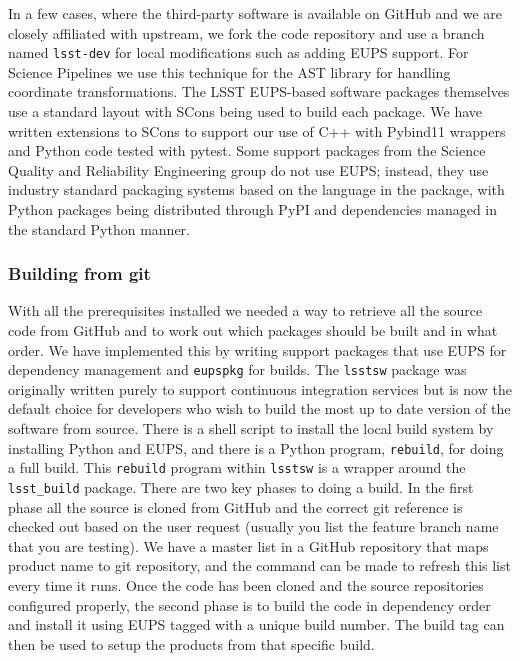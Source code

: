 In a few cases, where the third-party software is available on GitHub and we are closely affiliated with upstream, we fork the code repository and use a branch named \texttt{lsst-dev} for local modifications such as adding EUPS support.
For Science Pipelines we use this technique for the AST library\cite{2016A&C....15...33B} for handling coordinate transformations.
The LSST EUPS-based software packages themselves use a standard layout with SCons\cite{2005Scons1377085} being used to build each package.
We have written extensions to SCons to support our use of C++ with Pybind11 wrappers and Python code tested with pytest.
Some support packages from the Science Quality and Reliability Engineering group do not use EUPS; instead, they use industry standard packaging systems based on the language in the package, with Python packages being distributed through PyPI and dependencies managed in the standard Python manner.

\subsubsection{Building from git}

With all the prerequisites installed we needed a way to retrieve all the source code from GitHub and to work out which packages should be built and in what order.
We have implemented this by writing support packages that use EUPS for dependency management and \texttt{eupspkg} for builds.
The \texttt{lsstsw} package was originally written purely to support continuous integration services but is now the default choice for developers who wish to build the most up to date version of the software from source.
There is a shell script to install the local build system by installing Python and EUPS, and there is a Python program, \texttt{rebuild}, for doing a full build.
This \texttt{rebuild} program within \texttt{lsstsw} is a wrapper around the \texttt{lsst\_build} package.
There are two key phases to doing a build.
In the first phase all the source is cloned from GitHub and the correct git reference is checked out based on the user request (usually you list the feature branch name that you are testing).
We have a master list in a GitHub repository that maps product name to git repository, and the command can be made to refresh this list every time it runs.
Once the code has been cloned and the source repositories configured properly, the second phase is to build the code in dependency order and install it using EUPS tagged with a unique build number.
The build tag can then be used to setup the products from that specific build.


